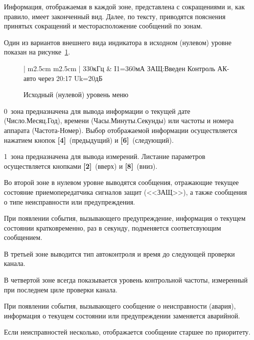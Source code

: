 Информация, отображаемая в каждой зоне, представлена с сокращениями и, как правило, имеет законченный вид. Далее, по тексту, приводятся пояснения принятых сокращений и месторасположение сообщений по зонам.

Один из вариантов внешнего вида индикатора в исходном (нулевом) уровне показан на рисунке~\ref{fig:overview_level0}. 

\begin{figure}[H]
	\centering
	
	\begin{tabular}{| m{2.5cm}  m{2.5cm} |}
		\firsthline
		330кГц	& \raggedleft I1=360мА 				\tabularnewline 
		 {ЗАЩ:Введен Контроль}	\tabularnewline 
		 {АК-авто через 20:17}	\tabularnewline 
		 {Uk=20дБ}				\tabularnewline
		\lasthline
	\end{tabular} 
	
	\caption{Исходный (нулевой) уровень меню}
	\label{fig:overview_level0}
\end{figure}

0~зона предназначена для вывода информации о текущей дате (Число.Месяц.Год), времени (Часы.Минуты.Секунды) или частоты и номера аппарата (Частота-Номер). Выбор отображаемой информации осуществляется нажатием кнопок \textbf{[4]}~(предыдущий) и \textbf{[6]}~(следующий).

1~зона предназначена для вывода измерений. Листание параметров осуществляется кнопками \textbf{[2]}~(вверх) и \textbf{[8]}~(вниз).

Во второй зоне в нулевом уровне выводятся сообщения, отражающие текущее состояние приемопередатчика сигналов защит (<<ЗАЩ>>), а также сообщения о типе неисправности или предупреждения.

При появлении события, вызывающего предупреждение, информация о текущем состоянии кратковременно, раз в секунду, подменяется соответсвующим сообщением.

В третьей зоне выводится тип автоконтроля и время до следующей проверки канала.

В четвертой зоне всегда показывается уровень контрольной частоты, измеренный при последнем циле проверки канала.

При появлении события, вызывающего сообщение о неисправности (авария), информация о текущем состоянии или предупреждении заменяется аварийной.

Если неисправностей несколько, отображается сообщение старшее по приоритету.


